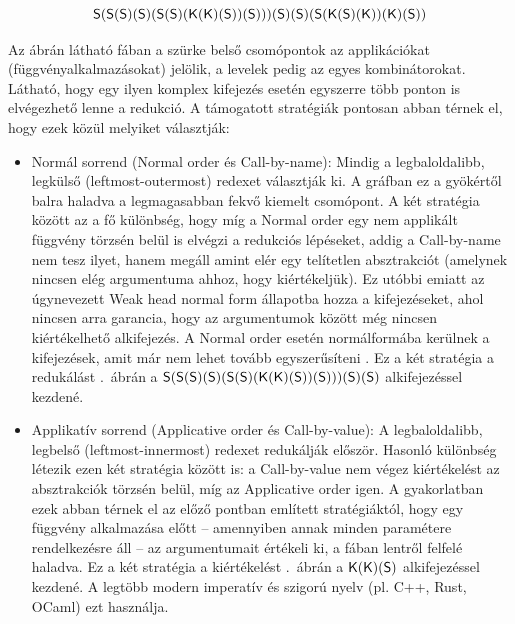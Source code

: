 \documentclass[a4paper,oneside]{article}
\begin{document}
\[
  \textsf{S}(\textsf{S}(\textsf{S})(\textsf{S})(\textsf{S}(\textsf{S})(\textsf{K}(\textsf{K})(\textsf{S}))(\textsf{S})))(\textsf{S})(\textsf{S})(\textsf{S}(\textsf{K}(\textsf{S})(\textsf{K}))(\textsf{K})(\textsf{S}))
\]

Az ábrán látható fában a szürke belső csomópontok az applikációkat (függvényalkalmazásokat) jelölik, a levelek pedig az egyes kombinátorokat. Látható, hogy egy ilyen komplex kifejezés esetén egyszerre több ponton is elvégezhető lenne a redukció. A támogatott stratégiák pontosan abban térnek el, hogy ezek közül melyiket választják:

\begin{itemize}
  \item Normál sorrend (\foreignlanguage{english}{Normal order} és \foreignlanguage{english}{Call-by-name}): Mindig a legbaloldalibb, legkülső (\foreignlanguage{english}{leftmost-outermost}) redexet választják ki. A gráfban ez a gyökértől balra haladva a legmagasabban fekvő kiemelt csomópont. A két stratégia között az a fő különbség, hogy míg a \foreignlanguage{english}{Normal order} egy nem applikált függvény törzsén belül is elvégzi a redukciós lépéseket, addig a \foreignlanguage{english}{Call-by-name} nem tesz ilyet, hanem megáll amint elér egy telítetlen absztrakciót (amelynek nincsen elég argumentuma ahhoz, hogy kiértékeljük). Ez utóbbi emiatt az úgynevezett \foreignlanguage{english}{Weak head normal form} állapotba hozza a kifejezéseket, ahol nincsen arra garancia, hogy az argumentumok között még nincsen kiértékelhető alkifejezés. A \foreignlanguage{english}{Normal order} esetén normálformába kerülnek a kifejezések, amit már nem lehet tovább egyszerűsíteni \cite{pierceTypesProgrammingLanguages2002a}. Ez a két stratégia a redukálást .~ábrán a $\textsf{S}(\textsf{S}(\textsf{S})(\textsf{S})(\textsf{S}(\textsf{S})(\textsf{K}(\textsf{K})(\textsf{S}))(\textsf{S})))(\textsf{S})(\textsf{S})$ alkifejezéssel kezdené.
  \item Applikatív sorrend (\foreignlanguage{english}{Applicative order} és \foreignlanguage{english}{Call-by-value}): A legbaloldalibb, legbelső (\foreignlanguage{english}{leftmost-innermost}) redexet redukálják először. Hasonló különbség létezik ezen két stratégia között is: a \foreignlanguage{english}{Call-by-value} nem végez kiértékelést az absztrakciók törzsén belül, míg az \foreignlanguage{english}{Applicative order} igen. A gyakorlatban ezek abban térnek el az előző pontban említett stratégiáktól, hogy egy függvény alkalmazása előtt -- amennyiben annak minden paramétere rendelkezésre áll -- az argumentumait értékeli ki, a fában lentről felfelé haladva. Ez a két stratégia a kiértékelést .~ábrán a $\textsf{K}(\textsf{K})(\textsf{S})$ alkifejezéssel kezdené. A legtöbb modern imperatív és szigorú nyelv (pl. C++, Rust, OCaml) ezt használja.
\end{itemize}
\end{document}
